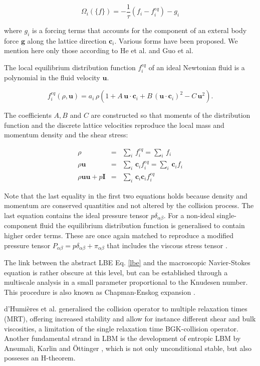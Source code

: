 \documentclass[8.5pt,twoside,twocolumn]{article}
\newcommand{\beq}{\begin{equation}}
\newcommand{\eeq}{\end{equation}}
\newcommand{\beqa}{\begin{eqnarray}}
\newcommand{\eeqa}{\end{eqnarray}}
\begin{document}
\beq
\Omega_i(\{f\}) = -\frac{1}{\tau}\left(f_i - f_i^{eq}\right) - g_i
\eeq

where $g_i$ is a forcing terms that accounts for the component of an 
exteral body force $\mathbf{g}$ along the lattice direction $\mathbf{c}_i$. 
Various forms have been proposed. We mention here only those according to 
He et al. \cite{He:1998} and Guo et al. \cite{Guo:2002} 


The local equilibrium distribution function $f_i^{eq}$ of an ideal Newtonian fluid is a polynomial
in the fluid velocity $\mathbf{u}$.

\beq
f_i^{eq}(\rho, \mathbf{u})=a_i\,\rho\left(1+A\,\mathbf{u}\cdot\mathbf{c}_i + B\,(\mathbf{u}\cdot\mathbf{c}_i)^2- C\,\mathbf{u}^2\right).
\eeq

The coefficients $A, B$ and $C$ are constructed so that moments of the distribution 
function and the discrete lattice velocities reproduce the local mass and momentum density
and the shear stress:

\beqa
\rho &=& \sum_i \, f_i^{eq} = \sum_i \, f_i\\
\rho \mathbf{u} &=& \sum_i \, \mathbf{c}_i f_i^{eq} = \sum_i \, \mathbf{c}_i f_i\\ 
\rho \mathbf{u} \mathbf{u} + p \mathbf{I} &=& \sum_i \, \mathbf{c}_i \mathbf{c}_i f_i^{eq}
\eeqa

Note that the last equality in the first two equations holds because density and momentum are
conserved quantities and not altered by the collision process. The last equation contains
the ideal pressure tensor $p \delta_{\alpha \beta}$. 
For a non-ideal single-component fluid the 
equilibrium distribution function is generalised to contain higher order terms. These 
are once again matched to reproduce a modified pressure tensor  
$P_{\alpha \beta}=p\delta_{\alpha \beta} + \pi_{\alpha \beta}$ that includes the 
viscous stress tensor .

The link between the abstract LBE Eq. \ref{lbe} and the macroscopic Navier-Stokes
equation is rather obscure at this level, but can be established through a multiscale
analysis in a small parameter proportional to the Knudesen number. This procedure is also
known as Chapman-Enskog expansion \cite{Succi:2001, Guo:2013}.

d'Humi\`eres et al. \cite{dHumieres:2002} generalised the collision operator to multiple relaxation times (MRT), 
offering increased stability and allow for instance different shear and bulk viscosities, a limitation of 
the single relaxation time BGK-collision operator.    
Another fundamental strand in LBM is the development of entropic LBM by Ansumali, Karlin 
and \"Ottinger \cite{Ansumali:2003}, which is not only unconditional stable, but also posseses an
H-theorem.
\end{document}

